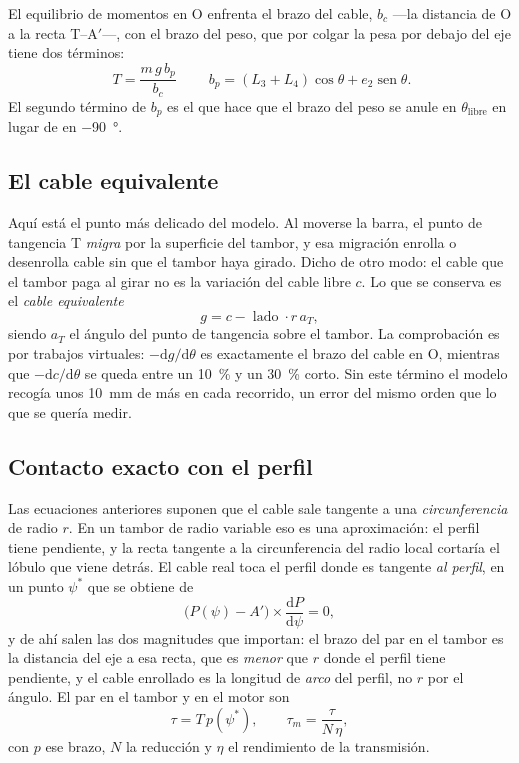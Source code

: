 El equilibrio de momentos en O enfrenta el brazo del cable, $b_c$ ---la distancia de O a la recta
T--A$'$---, con el brazo del peso, que por colgar la pesa por debajo del eje tiene dos términos:
\begin{equation}
  \boxed{\;T = \frac{m\,g\,b_p}{b_c}\;}\qquad
  b_p = (L_3+L_4)\cos\theta + e_2\operatorname{sen}\theta .
  \label{eq:tension}
\end{equation}
El segundo término de $b_p$ es el que hace que el brazo del peso se anule en
$\theta_{\text{libre}}$ en lugar de en \SI{-90}{\degree}.

\subsection{El cable equivalente}
\label{sec:mod-equivalente}

Aquí está el punto más delicado del modelo. Al moverse la barra, el punto de tangencia T
\emph{migra} por la superficie del tambor, y esa migración enrolla o desenrolla cable sin que el
tambor haya girado. Dicho de otro modo: el cable que el tambor paga al girar no es la variación del
cable libre $c$. Lo que se conserva es el \emph{cable equivalente}
\begin{equation}
  g = c - \operatorname{lado}\cdot r\,a_T ,
  \label{eq:equivalente}
\end{equation}
siendo $a_T$ el ángulo del punto de tangencia sobre el tambor. La comprobación es por trabajos
virtuales: $-\mathrm{d}g/\mathrm{d}\theta$ es exactamente el brazo del cable en O, mientras que
$-\mathrm{d}c/\mathrm{d}\theta$ se queda entre un \SI{10}{\percent} y un \SI{30}{\percent} corto.
Sin este término el modelo recogía unos \SI{10}{\milli\metre} de más en cada recorrido, un error del
mismo orden que lo que se quería medir.

\subsection{Contacto exacto con el perfil}
\label{sec:mod-contacto}

Las ecuaciones anteriores suponen que el cable sale tangente a una \emph{circunferencia} de radio
$r$. En un tambor de radio variable eso es una aproximación: el perfil tiene pendiente, y la recta
tangente a la circunferencia del radio local cortaría el lóbulo que viene detrás. El cable real toca
el perfil donde es tangente \emph{al perfil}, en un punto $\psi^*$ que se obtiene de
\begin{equation}
  \big(P(\psi) - A'\big) \times \frac{\mathrm{d}P}{\mathrm{d}\psi} = 0 ,
  \label{eq:contacto}
\end{equation}
y de ahí salen las dos magnitudes que importan: el brazo del par en el tambor es la distancia del
eje a esa recta, que es \emph{menor} que $r$ donde el perfil tiene pendiente, y el cable enrollado es
la longitud de \emph{arco} del perfil, no $r$ por el ángulo. El par en el tambor y en el motor son
\begin{equation}
  \tau = T\,p(\psi^*), \qquad \tau_m = \frac{\tau}{N\,\eta},
  \label{eq:par}
\end{equation}
con $p$ ese brazo, $N$ la reducción y $\eta$ el rendimiento de la transmisión.

